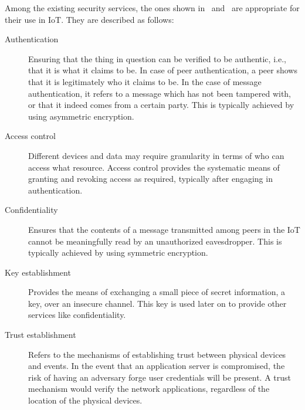 \documentclass[12pt]{article}
\begin{document}
Among the existing security services, the ones shown in~\cite{HELLAOUI2017173} and~\cite{ALABA201710} are appropriate for their use in IoT. They are described as follows: 

\begin{description}
\item [Authentication] Ensuring that the thing in question can be verified to be authentic, i.e., that it is what it claims to be. In case of peer authentication, a peer shows that it is legitimately who it claims to be. In the case of message authentication, it refers to a message which has not been tampered with, or that it indeed comes from a certain party. This is typically achieved by using asymmetric encryption.
\item [Access control] Different devices and data may require granularity in terms of who can access what resource. Access control provides the systematic means of granting and revoking access as required, typically after engaging in authentication.
\item [Confidentiality] Ensures that the contents of a message transmitted among peers in the IoT cannot be meaningfully read by an unauthorized eavesdropper. This is typically achieved by using symmetric encryption.
\item [Key establishment] Provides the means of exchanging a small piece of secret information, a key, over an insecure channel. This key is used later on to provide other services like confidentiality.
\item [Trust establishment] Refers to the mechanisms of establishing trust between physical devices and events. In the event that an application server is compromised, the risk of having an adversary forge user credentials will be present. A trust mechanism would verify the network applications, regardless of the location of the physical devices. 
\end{description}
\end{document}
